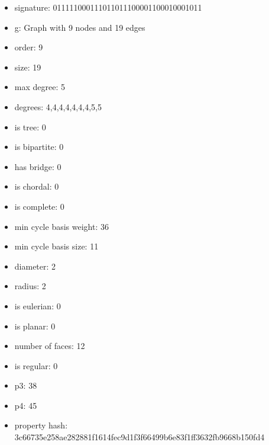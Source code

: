 \newpage
\begin{figure}
\end{figure}
\begin{itemize}
\item signature: 011111000111011011100001100010001011
\item g: Graph with 9 nodes and 19 edges
\item order: 9
\item size: 19
\item max degree: 5
\item degrees: 4,4,4,4,4,4,4,5,5
\item is tree: 0
\item is bipartite: 0
\item has bridge: 0
\item is chordal: 0
\item is complete: 0
\item min cycle basis weight: 36
\item min cycle basis size: 11
\item diameter: 2
\item radius: 2
\item is eulerian: 0
\item is planar: 0
\item number of faces: 12
\item is regular: 0
\item p3: 38
\item p4: 45
\item property hash: 3c66735e258ae282881f1614fec9d1f3f66499b6e83f1ff3632fb9668b150fd4
\end{itemize}
